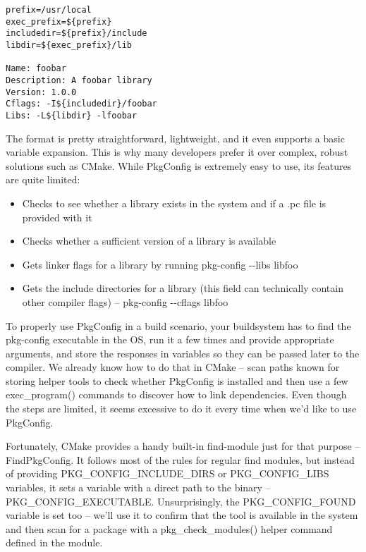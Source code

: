 \begin{lstlisting}[style=styleCMake]
prefix=/usr/local
exec_prefix=${prefix}
includedir=${prefix}/include
libdir=${exec_prefix}/lib

Name: foobar
Description: A foobar library
Version: 1.0.0
Cflags: -I${includedir}/foobar
Libs: -L${libdir} -lfoobar
\end{lstlisting}

The format is pretty straightforward, lightweight, and it even supports a basic variable expansion. This is why many developers prefer it over complex, robust solutions such as CMake. While PkgConfig is extremely easy to use, its features are quite limited:

\begin{itemize}
\item 
Checks to see whether a library exists in the system and if a .pc file is provided with it

\item 
Checks whether a sufficient version of a library is available

\item 
 Gets linker flags for a library by running pkg-config -{}-libs libfoo

\item 
Gets the include directories for a library (this field can technically contain other
compiler flags) – pkg-config -{}-cflags libfoo
\end{itemize}

To properly use PkgConfig in a build scenario, your buildsystem has to find the pkg-config executable in the OS, run it a few times and provide appropriate arguments, and store the responses in variables so they can be passed later to the compiler. We already know how to do that in CMake – scan paths known for storing helper tools to check whether PkgConfig is installed and then use a few exec\_program() commands to discover how to link dependencies. Even though the steps are limited, it seems excessive to do it every time when we'd like to use PkgConfig.

Fortunately, CMake provides a handy built-in find-module just for that purpose – FindPkgConfig. It follows most of the rules for regular find modules, but instead of providing PKG\_CONFIG\_INCLUDE\_DIRS or PKG\_CONFIG\_LIBS variables, it sets a variable with a direct path to the binary – PKG\_CONFIG\_EXECUTABLE. Unsurprisingly, the PKG\_CONFIG\_FOUND variable is set too – we'll use it to confirm that the tool is available in the system and then scan for a package with a pkg\_check\_modules() helper command defined in the module.

